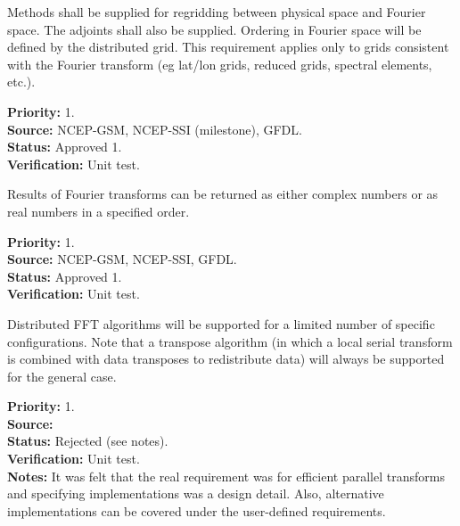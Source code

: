 
Methods shall be supplied for regridding between physical space and
Fourier space.  The adjoints shall also be supplied.  Ordering in
Fourier space will be defined by the distributed grid.  This requirement 
applies only to grids consistent with the Fourier transform (eg lat/lon grids,
reduced grids, spectral elements, etc.).

\begin{reqlist}
{\bf Priority:} 1. \\
{\bf Source:}  NCEP-GSM, NCEP-SSI (milestone), GFDL. \\
{\bf Status:} Approved 1. \\
{\bf Verification:} Unit test.
\end{reqlist}


Results of Fourier transforms can be returned as either
complex numbers or as real numbers in a specified order.

\begin{reqlist}
{\bf Priority:} 1. \\
{\bf Source:}  NCEP-GSM, NCEP-SSI, GFDL. \\
{\bf Status:} Approved 1. \\
{\bf Verification:} Unit test. 
\end{reqlist}


Distributed FFT algorithms will be supported for a limited
number of specific configurations.  Note that a transpose
algorithm (in which a local serial transform is combined
with data transposes to redistribute data) will always
be supported for the general case.

\begin{reqlist}
{\bf Priority:} 1. \\
{\bf Source:}  \\
{\bf Status:} Rejected (see notes). \\
{\bf Verification:} Unit test. \\
{\bf Notes:} It was felt that the real requirement was for
             efficient parallel transforms and specifying
             implementations was a design detail.  Also, alternative
             implementations can be covered under the user-defined
             requirements.
\end{reqlist}

